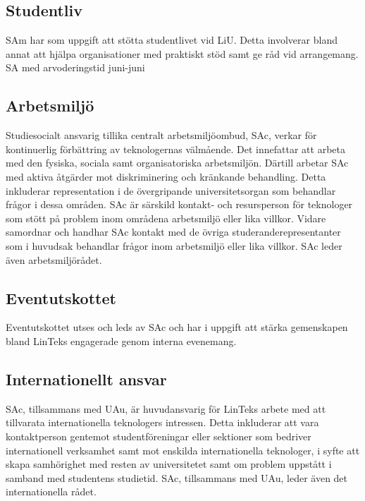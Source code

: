 \hypertarget{studentliv}{%
\subsection{Studentliv}\label{studentliv}}

SAm har som uppgift att stötta studentlivet vid LiU. Detta involverar
bland annat att hjälpa organisationer med praktiskt stöd samt ge råd vid
arrangemang. SA med arvoderingstid juni-juni

\hypertarget{arbetsmiljuxf6}{%
\subsection{Arbetsmiljö}\label{arbetsmiljuxf6}}

Studiesocialt ansvarig tillika centralt arbetsmiljöombud, SAc, verkar
för kontinuerlig förbättring av teknologernas välmående. Det innefattar
att arbeta med den fysiska, sociala samt organisatoriska arbetsmiljön.
Därtill arbetar SAc med aktiva åtgärder mot diskriminering och kränkande
behandling. Detta inkluderar representation i de övergripande
universitetsorgan som behandlar frågor i dessa områden. SAc är särskild
kontakt- och resursperson för teknologer som stött på problem inom
områdena arbetsmiljö eller lika villkor. Vidare samordnar och handhar
SAc kontakt med de övriga studeranderepresentanter som i huvudsak
behandlar frågor inom arbetsmiljö eller lika villkor. SAc leder även
arbetsmiljörådet.

\hypertarget{eventutskottet}{%
\subsection{Eventutskottet}\label{eventutskottet}}

Eventutskottet utses och leds av SAc och har i uppgift att stärka
gemenskapen bland LinTeks engagerade genom interna evenemang.

\hypertarget{internationellt-ansvar}{%
\subsection{Internationellt ansvar}\label{internationellt-ansvar}}

SAc, tillsammans med UAu, är huvudansvarig för LinTeks arbete med att
tillvarata internationella teknologers intressen. Detta inkluderar att
vara kontaktperson gentemot studentföreningar eller sektioner som
bedriver internationell verksamhet samt mot enskilda internationella
teknologer, i syfte att skapa samhörighet med resten av universitetet
samt om problem uppstått i samband med studentens studietid. SAc,
tillsammans med UAu, leder även det internationella rådet.

